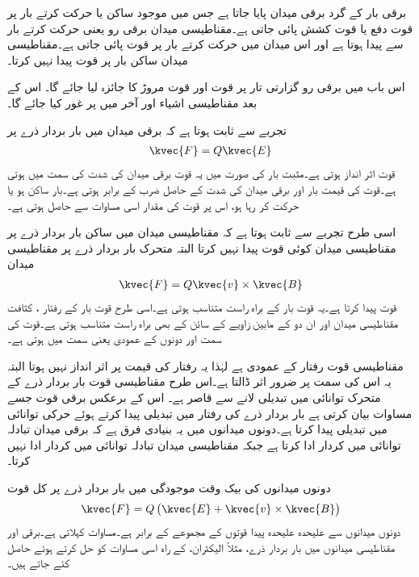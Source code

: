 برقی بار کے گرد برقی میدان پایا جاتا ہے جس میں موجود ساکن یا حرکت کرتے بار پر قوت دفع یا قوت کشش پائی جاتی ہے۔مقناطیسی میدان برقی رو یعنی حرکت کرتے بار سے پیدا ہوتا ہے اور اس میدان میں حرکت کرتے بار پر قوت پائی جاتی ہے۔مقناطیسی میدان ساکن بار پر قوت پیدا نہیں کرتا۔

اس باب میں برقی رو گزارتی تار پر قوت اور قوت مروڑ  کا جائزہ لیا جائے گا۔ اس کے بعد مقناطیسی اشیاء اور آخر میں پر غور کیا جائے گا۔

تجربے سے  ثابت ہوتا ہے کہ برقی میدان میں بار بردار ذرے  پر 
\begin{align}\label{مساوات_امالہ_برقی_قوت}
\kvec{F}=Q \kvec{E}
\end{align}
قوت اثر انداز ہوتی ہے۔مثبت بار کی صورت میں یہ قوت برقی میدان کی شدت  کی سمت میں ہوتی ہے۔قوت کی قیمت بار  اور برقی میدان کی شدت  کے حاصل ضرب کے برابر ہوتی ہے۔بار ساکن ہو یا حرکت کر رہا ہو، اس پر قوت کی مقدار اسی مساوات سے حاصل ہوتی ہے۔

اسی طرح تجربے سے ثابت ہوتا ہے کہ مقناطیسی میدان میں ساکن بار بردار ذرے  پر مقناطیسی میدان کوئی قوت پیدا نہیں کرتا البتہ متحرک بار بردار ذرے  پر مقناطیسی میدان
\begin{align}\label{مساوات_امالہ_مقناطیسی_قوت}
\kvec{F}=Q \kvec{v} \times \kvec{B} 
\end{align}
قوت پیدا کرتا ہے۔یہ قوت بار  کے براہ راست متناسب ہوتی ہے۔اسی طرح قوت بار کے رفتار ،  کثافت مقناطیسی میدان  اور ان دو کے مابین زاویے کے سائن کے بھی براہ راست متناسب ہوتی ہے۔قوت کی سمت  اور  دونوں کے عمودی یعنی  سمت میں ہوتی ہے۔

مقناطیسی قوت رفتار کے عمودی ہے لہٰذا یہ رفتار کی قیمت پر اثر انداز نہیں ہوتا البتہ یہ اس کی سمت پر ضرور اثر ڈالتا ہے۔اس طرح مقناطیسی قوت بار بردار ذرے کے متحرک توانائی میں تبدیلی لانے سے قاصر ہے۔ اس کے برعکس برقی قوت جسے مساوات  بیان کرتی ہے بار بردار ذرے کی رفتار میں تبدیلی پیدا کرتے ہوئے حرکی توانائی میں تبدیلی پیدا کرتا ہے۔دونوں میدانوں میں یہ بنیادی فرق ہے کہ برقی میدان تبادلہ توانائی میں کردار ادا کرتا ہے جبکہ مقناطیسی میدان تبادلہ توانائی میں کردار ادا نہیں کرتا۔

دونوں میدانوں کی بیک وقت موجودگی میں بار بردار ذرے پر کل قوت
\begin{align}\label{مساوات_امالہ_لورنز}
\kvec{F}=Q\left(\kvec{E}+\kvec{v} \times \kvec{B} \right)
\end{align}
دونوں میدانوں سے علیحدہ علیحدہ پیدا قوتوں کے مجموعے کے برابر ہے۔مساوات   کہلاتی ہے۔برقی اور مقناطیسی میدانوں میں بار بردار ذرے، مثلاً الیکٹران، کے راہ اسی مساوات کو حل کرتے ہوئے حاصل کئے جاتے ہیں۔

